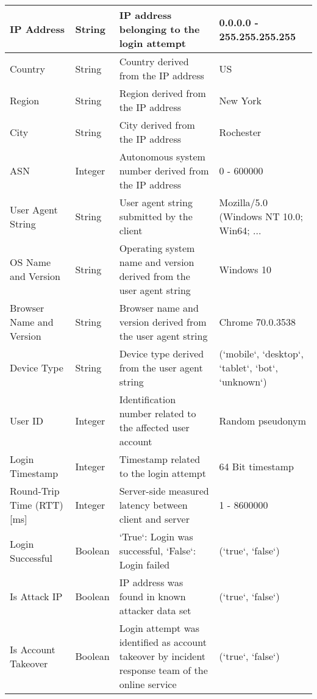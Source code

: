 \begin{longtable}{|p{}|p{}|p{}|p{}|}
    IP Address & String & IP address belonging to the login attempt & 0.0.0.0 - 255.255.255.255 \\ \hline
    Country & String & Country derived from the IP address & US \\ \hline
    Region & String & Region derived from the IP address & New York \\ \hline
    City & String & City derived from the IP address & Rochester \\ \hline
    ASN & Integer & Autonomous system number derived from the IP address & 0 - 600000 \\ \hline
    User Agent String & String & User agent string submitted by the client & Mozilla/5.0 (Windows NT 10.0; Win64; ... \\ \hline
    OS Name and Version & String & Operating system name and version derived from the user agent string & Windows 10 \\ \hline
    Browser Name and Version & String & Browser name and version derived from the user agent string & Chrome 70.0.3538 \\ \hline
    Device Type & String & Device type derived from the user agent string & (`mobile`, `desktop`, `tablet`, `bot`, `unknown`) \\ \hline
    User ID & Integer & Identification number related to the affected user account & Random pseudonym \\ \hline
    Login Timestamp & Integer & Timestamp related to the login attempt & 64 Bit timestamp \\ \hline
    Round-Trip Time (RTT) [ms] & Integer & Server-side measured latency between client and server & 1 - 8600000 \\ \hline
    Login Successful & Boolean & `True`: Login was successful, `False`: Login failed & (`true`, `false`) \\ \hline
    Is Attack IP & Boolean & IP address was found in known attacker data set & (`true`, `false`) \\ \hline
    Is Account Takeover & Boolean & Login attempt was identified as account takeover by incident response team of the online service & (`true`, `false`) \\ \hline
\end{longtable}